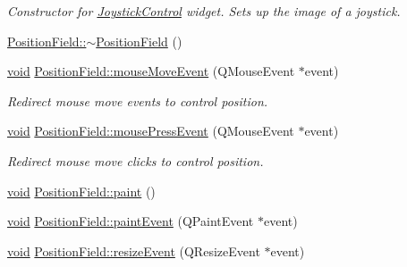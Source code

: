\begin{DoxyCompactItemize}
\begin{DoxyCompactList}\small\item\em Constructor for \hyperlink{class_joystick_control}{Joystick\-Control} widget. Sets up the image of a joystick. \end{DoxyCompactList}\item 
\hyperlink{group___g_c_s_control_gadget_plugin_ga4d08deed807894efd521d1f56338650d}{Position\-Field\-::$\sim$\-Position\-Field} ()
\item 
\hyperlink{group___u_a_v_objects_plugin_ga444cf2ff3f0ecbe028adce838d373f5c}{void} \hyperlink{group___g_c_s_control_gadget_plugin_gafb1fc61ba09724c992e090e61ea70a77}{Position\-Field\-::mouse\-Move\-Event} (Q\-Mouse\-Event $\ast$event)
\begin{DoxyCompactList}\small\item\em Redirect mouse move events to control position. \end{DoxyCompactList}\item 
\hyperlink{group___u_a_v_objects_plugin_ga444cf2ff3f0ecbe028adce838d373f5c}{void} \hyperlink{group___g_c_s_control_gadget_plugin_ga4e4feaca4c455eaf3f781ac5c02eb0ad}{Position\-Field\-::mouse\-Press\-Event} (Q\-Mouse\-Event $\ast$event)
\begin{DoxyCompactList}\small\item\em Redirect mouse move clicks to control position. \end{DoxyCompactList}\item 
\hyperlink{group___u_a_v_objects_plugin_ga444cf2ff3f0ecbe028adce838d373f5c}{void} \hyperlink{group___g_c_s_control_gadget_plugin_ga24b8b76a9c4255dc4777eed27af0a5de}{Position\-Field\-::paint} ()
\item 
\hyperlink{group___u_a_v_objects_plugin_ga444cf2ff3f0ecbe028adce838d373f5c}{void} \hyperlink{group___g_c_s_control_gadget_plugin_gad910afda0ec90e5e5e1dd3abd854f709}{Position\-Field\-::paint\-Event} (Q\-Paint\-Event $\ast$event)
\item 
\hyperlink{group___u_a_v_objects_plugin_ga444cf2ff3f0ecbe028adce838d373f5c}{void} \hyperlink{group___g_c_s_control_gadget_plugin_ga4f1879516e3c2fb610a4ebe9f5cb217e}{Position\-Field\-::resize\-Event} (Q\-Resize\-Event $\ast$event)
\end{DoxyCompactItemize}
